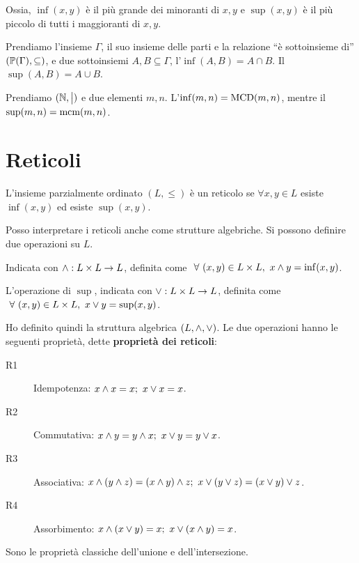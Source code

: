 Ossia, $\inf(x,y)$ \`e il pi\`u grande dei minoranti di $x,y$ e $\sup(x,y)$ \`e il pi\`u piccolo di tutti i maggioranti di $x, y$.

Prendiamo l'insieme $\Gamma$, il suo insieme delle parti e la relazione ``\`e sottoinsieme di'' $(\mathbb{P}(\Gamma),\subseteq)$, e due sottoinsiemi $A, B \subseteq \Gamma$, l'$\inf(A,B) = A \cap B$. Il $\sup(A,B) = A \cup B$.

Prendiamo $(\mathbb{N},\bigm|)$ e due elementi $m, n$. L'$\inf(m,n) = \operatorname{MCD}(m,n)$, mentre il $\sup(m,n) = \operatorname{mcm}(m,n)$.

\section{Reticoli}
\begin{defn}[Reticolo]
L'insieme parzialmente ordinato $(L, \leq)$ \`e un reticolo se $\forall x, y \in L $ esiste $\inf(x,y)$ ed esiste $\sup(x,y)$.
\end{defn}

Posso interpretare i reticoli anche come strutture algebriche. Si possono definire due operazioni su $L$. 

\begin{defn}
Indicata con $\wedge: L \times L \to L$, definita come $ \forall (x,y) \in L \times L , \ x \infop y = \inf(x,y) $.
\end{defn}
\begin{defn}
L'operazione di $\sup $, indicata con $ \vee: L \times L \to L$, definita come $\forall (x,y) \in L \times L , \ x \supop y = \sup(x,y)$.
\end{defn}

Ho definito quindi la struttura algebrica $(L, \wedge, \vee)$. Le due operazioni hanno le seguenti propriet\`a, dette \label{proprieta_dei_reticoli} \textbf{propriet\`a dei reticoli}:
\begin{description}
    \item[R1\label{itm:r1}] Idempotenza: $x \wedge x = x ; \ x \vee x = x$.
    \item [R2\label{itm:r2}] Commutativa: $x \wedge y = y \wedge x ; \ x \vee y = y \vee x$.
    \item [R3\label{itm:r3}] Associativa: $x \wedge ( y \wedge z) = (x \wedge y) \wedge z; \ x \vee ( y \vee z) = (x \vee y) \vee z$.
    \item [R4\label{itm:r4}] Assorbimento: $x \wedge (x \vee y) = x ; \ x \vee ( x \wedge y) = x$.
\end{description}
Sono le propriet\`a classiche dell'unione e dell'intersezione.

